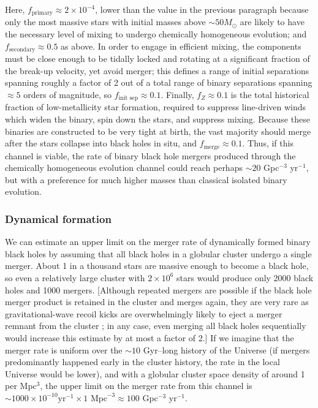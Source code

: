 \documentclass[iop,onecolumn]{revtex4}
\begin{document}
Here, $f_\textrm{primary} \approx 2 \times 10^{-4}$, lower than the value in the previous paragraph because only the most massive stars with initial masses above $\sim 50 M_\odot$ are likely to have the necessary level of mixing to undergo chemically homogeneous evolution; and $f_\textrm{secondary} \approx 0.5$ as above.  In order to engage in efficient mixing, the components must be close enough to be tidally locked and rotating at a significant fraction of the break-up velocity, yet avoid merger; this defines a range of initial separations spanning roughly a factor of 2 out of a total range of binary separations spanning $\approx 5$ orders of magnitude, so $f_\textrm{init sep} \approx 0.1$.  Finally, $f_Z \approx 0.1$ is the total historical fraction of low-metallicity star formation, required to suppress line-driven winds which widen the binary, spin down the stars, and suppress mixing.  Because these binaries are constructed to be very tight at birth, the vast majority should merge after the stars collapse into black holes in situ, and $f_\textrm{merge} \approx 0.1$. Thus, if this channel is viable, the rate of binary black hole mergers produced through the chemically homogeneous evolution channel could reach perhaps $\sim 20$ Gpc$^{-3}$ yr$^{-1}$, but with a preference for much higher masses than classical isolated binary evolution.


\subsubsection{Dynamical formation}

We can estimate an upper limit on the merger rate of dynamically formed binary black holes by assuming that all black holes in a globular cluster undergo a single merger.  About 1 in a thousand stars are massive enough to become a black hole, so even a relatively large cluster with $2\times 10^6$ stars would produce only 2000 black holes and 1000 mergers.  [Although repeated mergers are possible if the black hole merger product is retained in the cluster and merges again, they are very rare as gravitational-wave recoil kicks are overwhelmingly likely to eject a merger remnant from the cluster \citep{Rodriguez:2018}; in any case, even merging all black holes sequentially would increase this estimate by at most a factor of 2.]  If we imagine that the merger rate is uniform over the $\sim 10$ Gyr--long history of the Universe (if mergers predominantly happened early in the cluster history, the rate in the local Universe would be lower), and with a globular cluster space density of around 1 per Mpc$^3$, the upper limit on the merger rate from this channel is $\sim 1000 \times 10^{-10} \textrm{yr}^{-1} \times 1 \textrm{ Mpc}^{-3} \approx 100$ Gpc$^{-3}$ yr$^{-1}$.
\end{document}
